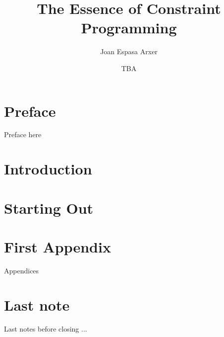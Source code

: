 \documentclass{book}
\title{The Essence of Constraint Programming}
\author{Joan Espasa Arxer}
\date{TBA}
\begin{document}
\frontmatter

\maketitle

\chapter{Preface}
Preface here

\mainmatter
\chapter{Introduction}


\chapter{Starting Out}


\appendix
\chapter{First Appendix}
Appendices

\backmatter
\chapter{Last note}
Last notes before closing ...
\end{document}
